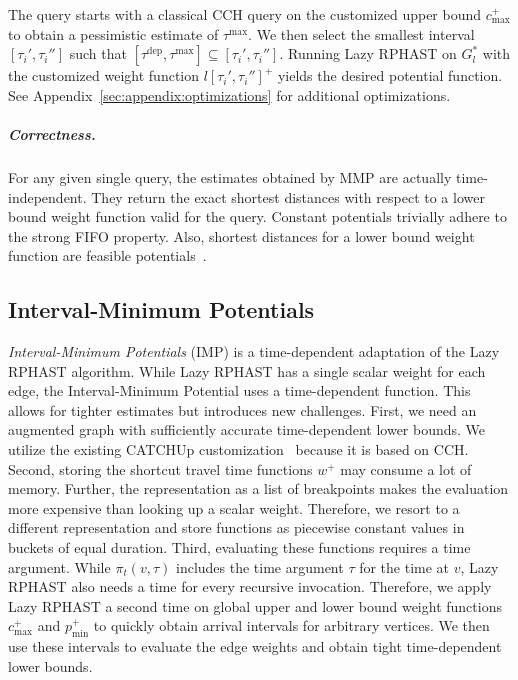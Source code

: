 \documentclass[a4paper,UKenglish,cleveref, autoref, thm-restate,anonymous]{lipics-v2021}
\newcommand*{\pred}{p}
\newcommand*{\comb}{c}
\newcommand*{\tdep}{\tau^{\operatorname{dep}}}
\newcommand*{\tmax}{\tau^{\max}}
\begin{document}
The query starts with a classical CCH query on the customized upper bound $\comb^+_{\max}$ to obtain a pessimistic estimate of $\tmax$.
We then select the smallest interval $[\tau_i', \tau_i'']$ such that $[\tdep,\tmax] \subseteq [\tau_i', \tau_i'']$.
Running Lazy RPHAST on $G^*_l$ with the customized weight function $l[\tau_i', \tau_i'']^+$ yields the desired potential function.
See Appendix~\ref{sec:appendix:optimizations} for additional optimizations.

\subparagraph{Correctness.}
For any given single query, the estimates obtained by MMP are actually time-independent.
They return the exact shortest distances with respect to a lower bound weight function valid for the query.
Constant potentials trivially adhere to the strong FIFO property.
Also, shortest distances for a lower bound weight function are feasible potentials~\cite{strasser_et_al:LIPIcs.SEA.2021.6}.

\subsection{Interval-Minimum Potentials}

\emph{Interval-Minimum Potentials} (IMP) is a time-dependent adaptation of the Lazy RPHAST algorithm.
While Lazy RPHAST has a single scalar weight for each edge, the Interval-Minimum Potential uses a time-dependent function.
This allows for tighter estimates but introduces new challenges.
First, we need an augmented graph with sufficiently accurate time-dependent lower bounds.
We utilize the existing CATCHUp customization~\cite{swz-sfert-21} because it is based on CCH.
Second, storing the shortcut travel time functions $w^+$ may consume a lot of memory.
Further, the representation as a list of breakpoints makes the evaluation more expensive than looking up a scalar weight.
Therefore, we resort to a different representation and store functions as piecewise constant values in buckets of equal duration.
Third, evaluating these functions requires a time argument.
While $\pi_t(v, \tau)$ includes the time argument $\tau$ for the time at $v$, Lazy RPHAST also needs a time for every recursive invocation.
Therefore, we apply Lazy RPHAST a second time on global upper and lower bound weight functions $\comb_{\max}^+$ and $\pred_{\min}^+$ to quickly obtain arrival intervals for arbitrary vertices.
We then use these intervals to evaluate the edge weights and obtain tight time-dependent lower bounds.
\end{document}
